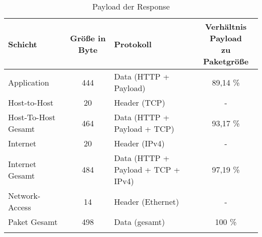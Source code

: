 \begin{longtable}[width=\textwidth]{l|c|l|c}
    \hline
    Schicht & Größe in Byte & Protokoll & \makecell[l]{Verhältnis Payload \\zu Paketgröße}
    \\\hline
    Application & 444 & Data (HTTP + Payload) & 89,14 \%
    \\\hline
    Host-to-Host & 20 & Header (TCP) & -
    \\\hline
    Host-To-Host Gesamt & 464 & Data (HTTP + Payload + TCP) & 93,17 \%
    \\\hline
    Internet & 20 & Header (IPv4) & -
    \\\hline
    Internet Gesamt & 484 & Data (HTTP + Payload + TCP + IPv4) & 97,19 \%
    \\\hline
    Network-Access & 14 & Header (Ethernet) & -
    \\\hline
    Paket Gesamt & 498 & Data (gesamt) & 100 \%
    \\
    \caption{Payload der Response}
\end{longtable}